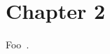 \chapter{Chapter 2}
\label{ch:ch2}

\begin{refsection}

Foo~\cite{jupyter}.

\printbibliography[heading=subbibliography]

\end{refsection}


